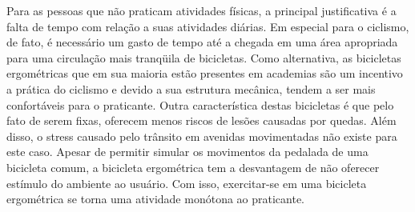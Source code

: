 Para as pessoas que não praticam atividades físicas, a principal justificativa é a falta de tempo com relação a suas atividades diárias. Em especial para o 
ciclismo, de fato, é necessário um gasto de tempo até a chegada em uma área apropriada para uma circulação mais tranqüila de bicicletas. Como alternativa, as 
bicicletas ergométricas que em sua maioria estão presentes em academias são um incentivo a prática do ciclismo e devido a sua estrutura mecânica, tendem a ser 
mais confortáveis para o praticante.
Outra característica destas bicicletas é que pelo fato de serem fixas, oferecem menos riscos de lesões causadas por quedas. Além disso, o stress causado pelo 
trânsito em avenidas movimentadas não existe para este caso. Apesar de permitir simular os movimentos da pedalada de uma bicicleta comum, a bicicleta ergométrica 
tem a desvantagem de não oferecer estímulo do ambiente ao usuário. Com isso, exercitar-se em uma bicicleta ergométrica se torna uma atividade monótona ao 
praticante.


